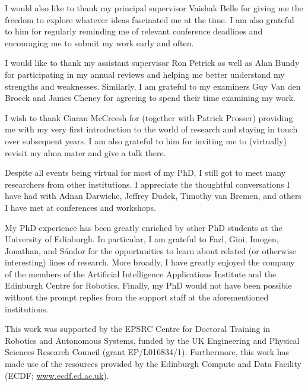\documentclass[phd,aiai,twoside,fullspacing,logo]{infthesis}
\theoremstyle{definition}
\theoremstyle{remark}
\numberwithin{assumption}{chapter}
\numberwithin{conjecture}{chapter}
\numberwithin{constraint}{chapter}
\numberwithin{fact}{chapter}
\numberwithin{proposition}{chapter}
\numberwithin{theorem}{chapter}
\numberwithin{lemma}{chapter}
\numberwithin{definition}{chapter}
\numberwithin{example}{chapter}
\numberwithin{experiment}{chapter}
\begin{document}
\begin{preliminary}
\begin{acknowledgements}
  I would also like to thank my principal supervisor Vaishak Belle for giving me
  the freedom to explore whatever ideas fascinated me at the time. I am also
  grateful to him for regularly reminding me of relevant conference deadlines
  and encouraging me to submit my work early and often.

  I would like to thank my assistant supervisor Ron Petrick as well as Alan
  Bundy for participating in my annual reviews and helping me better understand
  my strengths and weaknesses. Similarly, I am grateful to my examiners Guy Van
  den Broeck and James Cheney for agreeing to spend their time examining my
  work.

  I wish to thank Ciaran McCreesh for (together with Patrick Prosser) providing
  me with my very first introduction to the world of research and staying in
  touch over subsequent years. I am also grateful to him for inviting me to
  (virtually) revisit my alma mater and give a talk there.


  Despite all events being virtual for most of my PhD, I still got to meet many
  researchers from other institutions. I appreciate the thoughtful conversations
  I have had with Adnan Darwiche, Jeffrey Dudek, Timothy van Bremen, and others
  I have met at conferences and workshops.

  My PhD experience has been greatly enriched by other PhD students at the
  University of Edinburgh. In particular, I am grateful to Fazl, Gini, Imogen,
  Jonathan, and S\'{a}ndor for the opportunities to learn about related (or
  otherwise interesting) lines of research. More broadly, I have greatly enjoyed
  the company of the members of the Artificial Intelligence Applications
  Institute and the Edinburgh Centre for Robotics. Finally, my PhD would not
  have been possible without the prompt replies from the support staff at the
  aforementioned institutions.

  This work was supported by the EPSRC Centre for Doctoral Training in Robotics
  and Autonomous Systems, funded by the UK Engineering and Physical Sciences
  Research Council (grant EP/L016834/1). Furthermore, this work has made use of
  the resources provided by the Edinburgh Compute and Data Facility (ECDF;
  \url{www.ecdf.ed.ac.uk}).
\end{acknowledgements}

\standarddeclaration


\tableofcontents


\end{preliminary}
\end{document}
